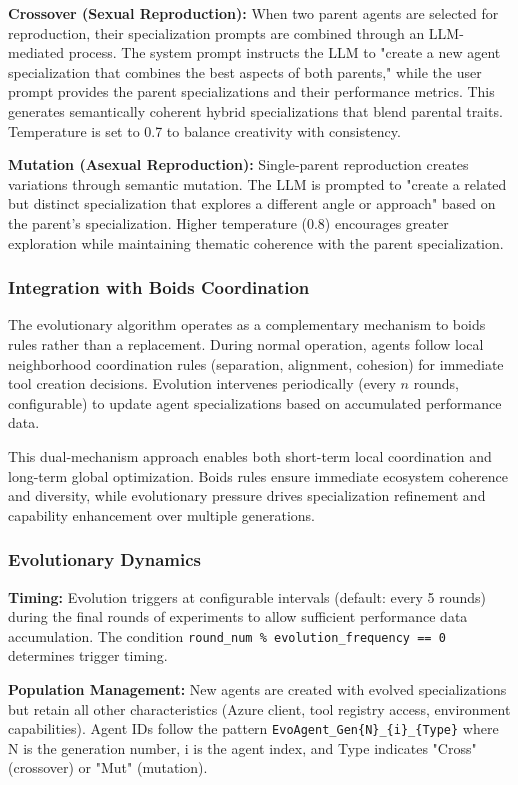 \textbf{Crossover (Sexual Reproduction):} When two parent agents are selected for reproduction, their specialization prompts are combined through an LLM-mediated process. The system prompt instructs the LLM to "create a new agent specialization that combines the best aspects of both parents," while the user prompt provides the parent specializations and their performance metrics. This generates semantically coherent hybrid specializations that blend parental traits. Temperature is set to 0.7 to balance creativity with consistency.

\textbf{Mutation (Asexual Reproduction):} Single-parent reproduction creates variations through semantic mutation. The LLM is prompted to "create a related but distinct specialization that explores a different angle or approach" based on the parent's specialization. Higher temperature (0.8) encourages greater exploration while maintaining thematic coherence with the parent specialization.

\subsubsection{Integration with Boids Coordination}

The evolutionary algorithm operates as a complementary mechanism to boids rules rather than a replacement. During normal operation, agents follow local neighborhood coordination rules (separation, alignment, cohesion) for immediate tool creation decisions. Evolution intervenes periodically (every $n$ rounds, configurable) to update agent specializations based on accumulated performance data.

This dual-mechanism approach enables both short-term local coordination and long-term global optimization. Boids rules ensure immediate ecosystem coherence and diversity, while evolutionary pressure drives specialization refinement and capability enhancement over multiple generations.

\subsubsection{Evolutionary Dynamics}

\textbf{Timing:} Evolution triggers at configurable intervals (default: every 5 rounds) during the final rounds of experiments to allow sufficient performance data accumulation. The condition \texttt{round\_num \% evolution\_frequency == 0} determines trigger timing.

\textbf{Population Management:} New agents are created with evolved specializations but retain all other characteristics (Azure client, tool registry access, environment capabilities). Agent IDs follow the pattern \texttt{EvoAgent\_Gen\{N\}\_\{i\}\_\{Type\}} where N is the generation number, i is the agent index, and Type indicates "Cross" (crossover) or "Mut" (mutation).


